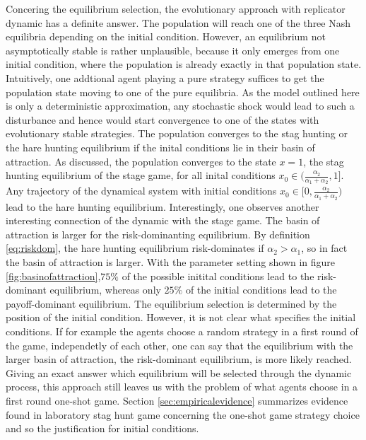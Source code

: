 \documentclass[11pt]{article}
\begin{document}
Concering the equilibrium selection, the evolutionary approach with replicator
dynamic has a definite answer. The population will reach one of the three
Nash equilibria depending on the initial condition. 
However, an equilibrium not asymptotically stable is rather unplausible,
because it only emerges from one initial condition, where the population
is already exactly in that population state. 
Intuitively, one addtional agent playing
a pure strategy suffices to get the population state moving to one of the
pure equilibria. As the model outlined here is only a deterministic
approximation, any stochastic shock would lead to such a disturbance and hence
would start convergence to one of the states with evolutionary stable 
strategies.
The population converges to the stag hunting or the hare
hunting equilibrium if the inital conditions lie in their basin of attraction.
As discussed, the population converges to the state $x=1$, the stag hunting 
equilibrium of the stage game, for all inital conditions 
$x_0 \in (\frac{\alpha_2}{\alpha_1+\alpha_2},1]$. Any trajectory of the 
dynamical system with initial conditions 
$x_0 \in [0,\frac{\alpha_2}{\alpha_1+\alpha_2})$ lead to the hare hunting
equilibrium. Interestingly, one observes another interesting connection of the 
dynamic with the stage game. The basin of attraction is larger for the
risk-dominanting equilibrium. By definition \eqref{eq:riskdom}, 
the hare hunting equilibrium risk-dominates if $\alpha_2 > \alpha_1$,
so in fact the basin of attraction is larger. With the parameter setting shown
in figure \ref{fig:basinofattraction},$75\%$ of the possible initital 
conditions lead to the risk-dominant equilibrium, whereas only $25\%$ of the 
initial conditions lead to the payoff-dominant equilibrium. 
The equilibrium selection is determined by the position of the initial
condition. However, it is not clear what specifies the initial conditions. 
If for example the agents choose a random strategy in a first round of the 
game, independetly of each other, one can say that the equilibrium with the
larger basin of attraction, the risk-dominant equilibrium, is more likely 
reached.  
Giving an exact answer which equilibrium will be selected through the dynamic
process, this approach still leaves us with the problem of what agents 
choose in a first round one-shot game. Section \ref{sec:empiricalevidence} 
summarizes evidence found in laboratory stag hunt game concerning the 
one-shot game strategy choice and so the justification for initial conditions.
\end{document}
